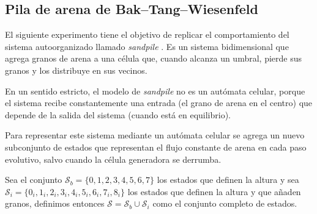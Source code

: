 \subsection{Pila de arena de Bak–Tang–Wiesenfeld}\label{sec:exp1_sandpile}

El siguiente experimento tiene el objetivo de replicar el comportamiento del sistema autoorganizado llamado \textit{sandpile} \cite{bak1987}. Es un sistema bidimensional que agrega granos de arena a una célula que, cuando alcanza un umbral, pierde sus granos y los distribuye en sus vecinos.

En un sentido estricto, el modelo de \textit{sandpile} no es un autómata celular, porque el sistema recibe constantemente una entrada (el grano de arena en el centro) que depende de la salida del sistema (cuando está en equilibrio). 

Para representar este sistema mediante un autómata celular se agrega un nuevo subconjunto de estados que representan el flujo constante de arena en cada paso evolutivo, salvo cuando la célula generadora se derrumba. 

Sea el conjunto $\mathcal{S}_b = \{0,1,2,3,4, 5, 6, 7\}$ los estados que definen la altura y sea $\mathcal{S}_i = \{ 0_i, 1_i, 2_i, 3_i, 4_i, 5_i, 6_i, 7_i, 8_i\}$ los estados que definen la altura y que añaden granos, definimos entonces $\mathcal{S} = \mathcal{S}_b \cup \mathcal{S}_i$ como el conjunto completo de estados. 

